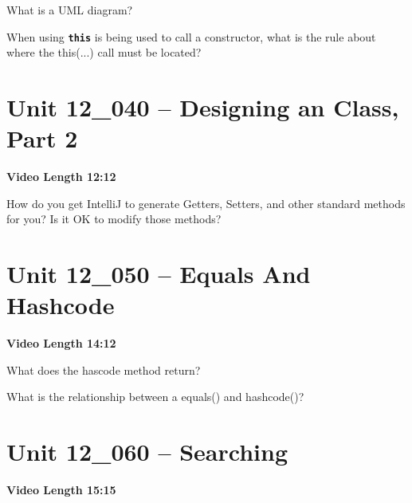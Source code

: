 \documentclass[letterpaper,12pt]{exam}
\newcommand{\unit}{Unit 12}
\begin{document}
\begin{questions}
\begin{samepage}
    \question What is a UML diagram?
    \vspace{5mm}
\end{samepage}

\begin{samepage}
    \question When using \texttt{\textbf{this}} is being used to call a constructor, what is the rule about where the this(...) call must be located?
    \vspace{5mm}
\end{samepage}

\section*{\unit\_040 -- Designing an Class, Part 2} 
\par{\selectfont\textbf{Video Length 12:12}}

\begin{samepage}
    \question How do you get IntelliJ to generate Getters, Setters, and other standard methods for you?  Is it OK to modify those methods?
    \vspace{5mm}
\end{samepage}

\section*{\unit\_050 -- Equals And Hashcode} 
\par{\selectfont\textbf{Video Length 14:12}}

\begin{samepage}
    \question What does the hascode method return?
    \vspace{5mm}
\end{samepage}

\begin{samepage}
    \question What is the relationship between a equals() and hashcode()?
    \vspace{5mm}
\end{samepage}


\section*{\unit\_060 -- Searching} 
\par{\selectfont\textbf{Video Length 15:15}}


\end{questions}
\end{document}
